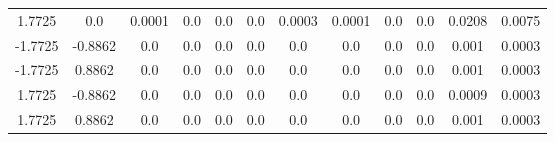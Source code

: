 \documentclass[a4paper,14pt]{extarticle}
\begin{document}
\begin{landscape}
\begin{table}[H]
\begin{tabular}{|c|c|*{10}{c}|}
1.7725  & 0.0     & 0.0001 & 0.0    & 0.0    & 0.0    & 0.0003 & 0.0001 & 0.0    & 0.0    & 0.0208 & 0.0075 \\ 
-1.7725 & -0.8862 & 0.0    & 0.0    & 0.0    & 0.0    & 0.0    & 0.0    & 0.0    & 0.0    & 0.001  & 0.0003 \\ 
-1.7725 & 0.8862  & 0.0    & 0.0    & 0.0    & 0.0    & 0.0    & 0.0    & 0.0    & 0.0    & 0.001  & 0.0003 \\ 
1.7725  & -0.8862 & 0.0    & 0.0    & 0.0    & 0.0    & 0.0    & 0.0    & 0.0    & 0.0    & 0.0009 & 0.0003 \\ 
1.7725  & 0.8862  & 0.0    & 0.0    & 0.0    & 0.0    & 0.0    & 0.0    & 0.0    & 0.0    & 0.001  & 0.0003 \\
\hline
\end{tabular}
\end{table} 


\end{landscape}
\end{document}
